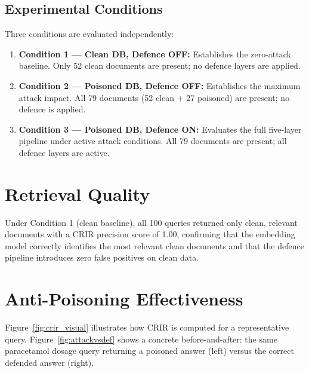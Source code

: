 \subsection{Experimental Conditions}
Three conditions are evaluated independently:
\begin{enumerate}
    \item \textbf{Condition 1 --- Clean DB, Defence OFF:} Establishes the zero-attack baseline. Only 52 clean documents are present; no defence layers are applied.
    \item \textbf{Condition 2 --- Poisoned DB, Defence OFF:} Establishes the maximum attack impact. All 79 documents (52 clean + 27 poisoned) are present; no defence is applied.
    \item \textbf{Condition 3 --- Poisoned DB, Defence ON:} Evaluates the full five-layer pipeline under active attack conditions. All 79 documents are present; all defence layers are active.
\end{enumerate}

\section{Retrieval Quality}

Under Condition 1 (clean baseline), all 100 queries returned only clean, relevant documents with a CRIR precision score of 1.00, confirming that the embedding model correctly identifies the most relevant clean documents and that the defence pipeline introduces zero false positives on clean data.

\section{Anti-Poisoning Effectiveness}

Figure~\ref{fig:crir_visual} illustrates how CRIR is computed for a representative query. Figure~\ref{fig:attackvsdef} shows a concrete before-and-after: the same paracetamol dosage query returning a poisoned answer (left) versus the correct defended answer (right).

